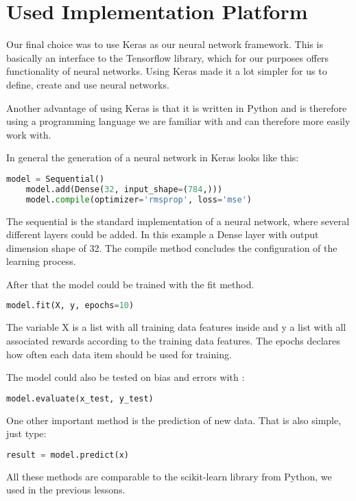 \section{Used Implementation Platform}
Our final choice was to use Keras as our neural network framework. This is basically an interface to the Tensorflow library, which for our purposes offers functionality of neural networks. Using Keras made it a lot simpler for us to define, create and use neural networks.

Another advantage of using Keras is that it is written in Python and is therefore using a programming language we are familiar with and can therefore more easily work with.

In general the generation of a neural network in Keras looks like this:
\begin{lstlisting}[frame=single,language=Python,caption={Creation of a neural network in Keras},captionpos=b]
	model = Sequential()
	model.add(Dense(32, input_shape=(784,)))
	model.compile(optimizer='rmsprop', loss='mse')
\end{lstlisting}
 The sequential is the standard implementation of a neural network, where several different layers could be added. In this example a Dense layer with output dimension shape of 32. The compile method concludes the configuration of the learning process.

After that the model could be trained with the fit method. 
\begin{lstlisting}[frame=single,language=Python,caption={Trianing of a neural network in Keras},captionpos=b]
	model.fit(X, y, epochs=10)
\end{lstlisting}
The variable X is a list with all training data features inside and y a list with all associated rewards according to the training data features. The epochs declares how often each data item should be used for training.

The model could also be tested on bias and errors with :
\begin{lstlisting}[frame=single,language=Python,caption={Evaluation of a neural network in Keras},captionpos=b]
	model.evaluate(x_test, y_test)
\end{lstlisting}

One other important method is the prediction of new data. That is also simple, just type:
\begin{lstlisting}[frame=single,language=Python,caption={Predicting of a neural network in Keras},captionpos=b]
	result = model.predict(x)
\end{lstlisting}

All these methods are comparable to the scikit-learn library from Python, we used in the previous lessons.
